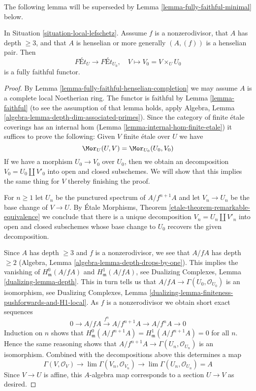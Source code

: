 \noindent
The following lemma will be superseded by
Lemma \ref{lemma-fully-faithful-minimal} below.

\begin{lemma}
\label{lemma-fully-faithful}
In Situation \ref{situation-local-lefschetz}.
Asssume $f$ is a nonzerodivisor, that $A$ has depth $\geq 3$, and that
$A$ is henselian or more generally $(A, (f))$ is a henselian pair. Then
$$
\textit{F\'Et}_U \longrightarrow \textit{F\'Et}_{U_0},\quad
V \longmapsto V_0 = V \times_U U_0
$$
is a fully faithful functor.
\end{lemma}

\begin{proof}
By Lemma \ref{lemma-fully-faithful-henselian-completion} we may assume $A$
is a complete local Noetherian ring. The functor is faithful by
Lemma \ref{lemma-faithful} (to see the assumption of that lemma holds, apply
Algebra, Lemma \ref{algebra-lemma-depth-dim-associated-primes}).
Since the category of finite \'etale coverings has an internal hom
(Lemma \ref{lemma-internal-hom-finite-etale})
it suffices to prove the following: Given $V$ finite \'etale over $U$ we have
$$
\Mor_U(U, V) = \Mor_{U_0}(U_0, V_0)
$$
If we have a morphism $U_0 \to V_0$ over $U_0$, then we obtain an
decomposition $V_0 = U_0 \amalg V'_0$ into open and closed subschemes.
We will show that this implies the same thing for $V$ thereby
finishing the proof.

\medskip\noindent
For $n \geq 1$ let $U_n$ be the punctured spectrum of $A/f^{n + 1}A$
and let $V_n \to U_n$ be the base change of $V \to U$. By
\'Etale Morphisms, Theorem \ref{etale-theorem-remarkable-equivalence}
we conclude that there is a unique decomposition
$V_n = U_n \amalg V'_n$
into open and closed subschemes whose base change to $U_0$ recovers
the given decomposition.

\medskip\noindent
Since $A$ has depth $\geq 3$ and $f$ is a nonzerodivisor, we see
that $A/fA$ has depth $\geq 2$
(Algebra, Lemma \ref{algebra-lemma-depth-drops-by-one}).
This implies the
vanishing of $H^0_\mathfrak m(A/fA)$ and $H^1_\mathfrak m(A/fA)$, see
Dualizing Complexes, Lemma \ref{dualizing-lemma-depth}.
This in turn
tells us that $A/fA \to \Gamma(U_0, \mathcal{O}_{U_0})$ is an isomorphism, see
Dualizing Complexes, Lemma
\ref{dualizing-lemma-finiteness-pushforwards-and-H1-local}.
As $f$ is a nonzerodivisor we obtain short exact sequences
$$
0 \to A/fA \xrightarrow{f^n} A/f^{n + 1}A \to A/f^n A \to 0
$$
Induction on $n$ shows that
$H^0_\mathfrak m(A/f^{n + 1}A) = H^1_\mathfrak m(A/f^{n + 1}A) = 0$
for all $n$. Hence the same reasoning shows that
$A/f^{n + 1}A \to \Gamma(U_n, \mathcal{O}_{U_n})$
is an isomorphism.
Combined with the decompositions above this determines a map
$$
\Gamma(V, \mathcal{O}_V) \to
\lim \Gamma(V_n, \mathcal{O}_{V_n}) \to
\lim \Gamma(U_n, \mathcal{O}_{U_n}) = A
$$
Since $V \to U$ is affine, this $A$-algebra map corresponds to
a section $U \to V$ as desired.
\end{proof}

